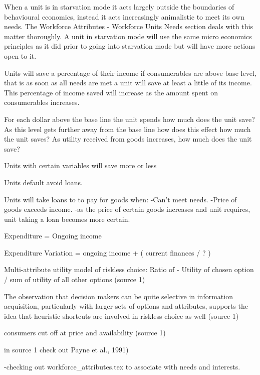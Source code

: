 When a unit is in starvation mode it acts largely outside the boundaries of behavioural economics, instead it acts increasingly animalistic to meet its own needs. The Workforce Attributes - Workforce Units Needs section deals with this matter thoroughly. A unit in starvation mode will use the same micro economics principles as it did prior to going into starvation mode but will have more actions open to it.




Units will save a percentage of their income if consumerables are above base level, that is as soon as all needs are met a unit will save at least a little of its income. This percentage of income saved will increase as the amount spent on consumerables increases.

For each dollar above the base line the unit spends how much does the unit save?
As this level gets further away from the base line how does this effect how much the unit saves?
As utility received from goods increases, how much does the unit save? 




Units with certain variables will save more or less


Units default avoid loans.

Units will take loans to to pay for goods when:
-Can't meet needs.
-Price of goods exceeds income.
	-as the price of certain goods increases and unit requires, unit taking a loan becomes more certain. 





 

Expenditure = Ongoing income 

Expenditure Variation = ongoing income + ( current finances / ? )

Multi-attribute utility model of riskless choice:
Ratio of - Utility of chosen option / sum of utility of all other options (source 1)

The observation that decision makers can be quite selective in information acquisition, particularly with larger sets of options and attributes, supports the idea that heuristic shortcuts are involved in riskless choice as well (source 1)

consumers cut off at price and availability (source 1)

in source 1 check out Payne et al., 1991)


-checking out workforce_attributes.tex to associate with needs and interests.


